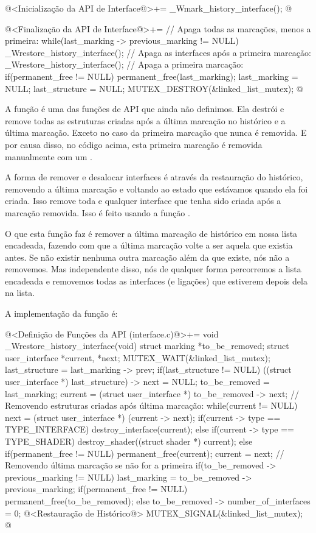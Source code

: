 \iniciocodigo
@<Inicialização da API de Interface@>+=
_Wmark_history_interface();
@
\fimcodigo

\iniciocodigo
@<Finalização da API de Interface@>+=
// Apaga todas as marcações, menos a primeira:
while(last_marking -> previous_marking != NULL){
  _Wrestore_history_interface();
}
// Apaga as interfaces após a primeira marcação:
_Wrestore_history_interface();
// Apaga a primeira marcação:
if(permanent_free != NULL)
  permanent_free(last_marking);
last_marking = NULL;
last_structure = NULL;
MUTEX_DESTROY(&linked_list_mutex);
@
\fimcodigo

A função  é uma das funções
de API que ainda não definimos. Ela destrói e remove todas as
estruturas criadas após a última marcação no histórico e a última
marcação. Exceto no caso da primeira marcação que nunca é removida. E
por causa disso, no código acima, esta primeira marcação é removida
manualmente com um .


A forma de remover e desalocar interfaces é através da restauração do
histórico, removendo a última marcação e voltando ao estado que
estávamos quando ela foi criada. Isso remove toda e qualquer interface
que tenha sido criada após a marcação removida. Isso é feito usando a
função
.

O que esta função faz é remover a última marcação de histórico em
nossa lista encadeada, fazendo com que a última marcação volte a ser
aquela que existia antes. Se não existir nenhuma outra marcação além
da que existe, nós não a removemos. Mas independente disso, nós de
qualquer forma percorremos a lista encadeada e removemos todas as
interfaces (e ligações) que estiverem depois dela na lista.

A implementação da função é:

\iniciocodigo
@<Definição de Funções da API (interface.c)@>+=
void _Wrestore_history_interface(void){
  struct marking *to_be_removed;
  struct user_interface *current, *next;
  MUTEX_WAIT(&linked_list_mutex);
  last_structure = last_marking -> prev;
  if(last_structure != NULL)
    ((struct user_interface *) last_structure) -> next = NULL;
  to_be_removed = last_marking;
  current = (struct user_interface *) to_be_removed -> next;
  // Removendo estruturas criadas após última marcação:
  while(current != NULL){
    next = (struct user_interface *) (current -> next);
    if(current -> type == TYPE_INTERFACE)
      destroy_interface(current);
    else if(current -> type == TYPE_SHADER)
      destroy_shader((struct shader *) current);
    else if(permanent_free != NULL)
      permanent_free(current);
    current = next;
  }
  // Removendo última marcação se não for a primeira
  if(to_be_removed -> previous_marking != NULL){
    last_marking = to_be_removed -> previous_marking;
    if(permanent_free != NULL)
      permanent_free(to_be_removed);
  }
  else
    to_be_removed -> number_of_interfaces = 0;
  @<Restauração de Histórico@>
  MUTEX_SIGNAL(&linked_list_mutex);
}
@
\fimcodigo

